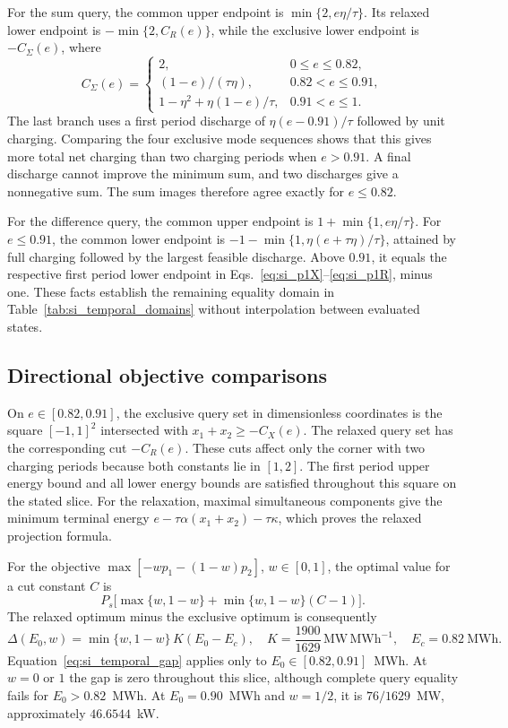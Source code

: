 For the sum query, the common upper endpoint is $\min\{2,e\eta/\tau\}$. Its relaxed lower endpoint is $-\min\{2,C_R(e)\}$, while the exclusive lower endpoint is $-C_\Sigma(e)$, where
\begin{equation}
C_\Sigma(e)=
\begin{cases}
2,&0\leq e\leq 0.82,\\
(1-e)/(\tau\eta),&0.82<e\leq 0.91,\\
1-\eta^2+\eta(1-e)/\tau,&0.91<e\leq 1.
\end{cases}
\label{eq:si_sum_endpoint}
\end{equation}
The last branch uses a first period discharge of $\eta(e-0.91)/\tau$ followed by unit charging. Comparing the four exclusive mode sequences shows that this gives more total net charging than two charging periods when $e>0.91$. A final discharge cannot improve the minimum sum, and two discharges give a nonnegative sum. The sum images therefore agree exactly for $e\leq0.82$.

For the difference query, the common upper endpoint is $1+\min\{1,e\eta/\tau\}$. For $e\leq0.91$, the common lower endpoint is $-1-\min\{1,\eta(e+\tau\eta)/\tau\}$, attained by full charging followed by the largest feasible discharge. Above $0.91$, it equals the respective first period lower endpoint in Eqs.~\eqref{eq:si_p1X}--\eqref{eq:si_p1R}, minus one. These facts establish the remaining equality domain in Table~\ref{tab:si_temporal_domains} without interpolation between evaluated states.

\subsection{Directional objective comparisons}
\label{si:temporal_objectives}
On $e\in[0.82,0.91]$, the exclusive query set in dimensionless coordinates is the square $[-1,1]^2$ intersected with $x_1+x_2\geq-C_X(e)$. The relaxed query set has the corresponding cut $-C_R(e)$. These cuts affect only the corner with two charging periods because both constants lie in $[1,2]$. The first period upper energy bound and all lower energy bounds are satisfied throughout this square on the stated slice. For the relaxation, maximal simultaneous components give the minimum terminal energy $e-\tau\alpha(x_1+x_2)-\tau\kappa$, which proves the relaxed projection formula.

For the objective $\max[-wp_1-(1-w)p_2]$, $w\in[0,1]$, the optimal value for a cut constant $C$ is
\begin{equation}
P_s\bigl[\max\{w,1-w\}+\min\{w,1-w\}(C-1)\bigr].
\end{equation}
The relaxed optimum minus the exclusive optimum is consequently
\begin{equation}
\Delta(E_0, w)=\min\{w,1-w\}\, K(E_0-E_c),\quad
K=\frac{1900}{1629}\,\mathrm{MW\, MWh^{-1}},\quad E_c=0.82~\mathrm{MWh}.
\label{eq:si_temporal_gap}
\end{equation}
Equation~\eqref{eq:si_temporal_gap} applies only to $E_0\in[0.82,0.91]$~MWh. At $w=0$ or $1$ the gap is zero throughout this slice, although complete query equality fails for $E_0>0.82$~MWh. At $E_0=0.90$~MWh and $w=1/2$, it is $76/1629$~MW, approximately $46.6544$~kW.

